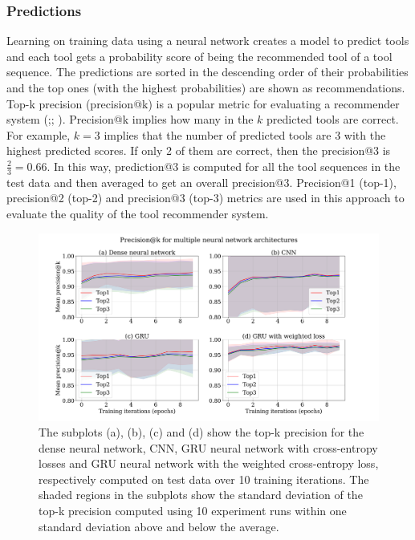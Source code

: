 \documentclass{bioinfo}
\begin{document}
\subsubsection{Predictions}
Learning on training data using a neural network creates a model to predict tools and each tool gets a probability score of being the recommended tool of a tool sequence. The predictions are sorted in the descending order of their probabilities and the top ones (with the highest probabilities) are shown as recommendations. Top-k precision (precision@k) is a popular metric for evaluating a recommender system (\cite{Said2013ATR};\cite{Kang}; \cite{Deshpande}). Precision@k implies how many in the $k$ predicted tools are correct. For example, $k=3$ implies that the number of predicted tools are 3 with the highest predicted scores. If only 2 of them are correct, then the precision@3 is $\frac{2}{3} = 0.66$. In this way, prediction@3 is computed for all the tool sequences in the test data and then averaged to get an overall precision@3. Precision@1 (top-1), precision@2 (top-2) and precision@3 (top-3) metrics are used in this approach to evaluate the quality of the tool recommender system.

\begin{figure}
\centerline{\includegraphics[scale=0.19]{bioinformatics_journal/images/precision.png}} \caption{The subplots (a), (b), (c) and (d) show the top-k precision for the dense neural network, CNN, GRU neural network with cross-entropy losses and GRU neural network with the weighted cross-entropy loss, respectively computed on test data over 10 training iterations. The shaded regions in the subplots show the standard deviation of the top-k precision computed using 10 experiment runs within one standard deviation above and below the average.}\label{figure:04}
\end{figure}
\end{document}
